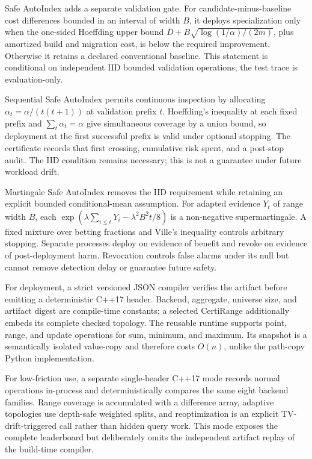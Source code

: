\documentclass[10pt]{article}
\begin{document}
Safe AutoIndex adds a separate validation gate. For candidate-minus-baseline
cost differences bounded in an interval of width $B$, it deploys specialization
only when the one-sided Hoeffding upper bound
$\bar D+B\sqrt{\log(1/\alpha)/(2m)}$, plus amortized build and migration cost,
is below the required improvement. Otherwise it retains a declared
conventional baseline. This statement is conditional on independent IID
bounded validation operations; the test trace is evaluation-only.

Sequential Safe AutoIndex permits continuous inspection by allocating
$\alpha_t=\alpha/(t(t+1))$ at validation prefix $t$. Hoeffding's inequality
at each fixed prefix and $\sum_t\alpha_t=\alpha$ give simultaneous coverage by
a union bound, so deployment at the first successful prefix is valid under
optional stopping. The certificate records that first crossing, cumulative
risk spent, and a post-stop audit. The IID condition remains necessary; this
is not a guarantee under future workload drift.

Martingale Safe AutoIndex removes the IID requirement while retaining an
explicit bounded conditional-mean assumption. For adapted evidence $Y_t$ of
range width $B$, each
$\exp(\lambda\sum_{i\le t}Y_i-\lambda^2B^2t/8)$ is a non-negative
supermartingale. A fixed mixture over betting fractions and Ville's inequality
controls arbitrary stopping. Separate processes deploy on evidence of benefit
and revoke on evidence of post-deployment harm. Revocation controls false
alarms under its null but cannot remove detection delay or guarantee future
safety.

For deployment, a strict versioned JSON compiler verifies the artifact before
emitting a deterministic C++17 header. Backend, aggregate, universe size, and
artifact digest are compile-time constants; a selected CertiRange additionally
embeds its complete checked topology. The reusable runtime supports point,
range, and update operations for sum, minimum, and maximum. Its snapshot is a
semantically isolated value-copy and therefore costs $O(n)$, unlike the
path-copy Python implementation.

For low-friction use, a separate single-header C++17 mode records normal
operations in-process and deterministically compares the same eight backend
families. Range coverage is accumulated with a difference array, adaptive
topologies use depth-safe weighted splits, and reoptimization is an explicit
TV-drift-triggered call rather than hidden query work. This mode exposes the
complete leaderboard but deliberately omits the independent artifact replay
of the build-time compiler.
\end{document}
